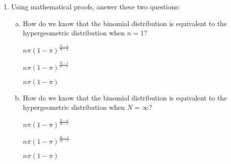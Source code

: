 \begin{enumerate}
  \item Using mathematical proofs, answer these two questions: 
  \begin{enumerate}[a) ]
   \item How do we know that the binomial distribution is equivalent to the hypergeometric distribution when $n=1$? 
\begin{solution}

$n \pi (1 - \pi)^{\frac{N-n}{N-1}}$

$n \pi (1 - \pi)^{\frac{N-1}{N-1}}$

$n \pi (1 - \pi)$
\end{solution}
   \item How do we know that the binomial distribution is equivalent to the hypergeometric distribution when $N=\infty$?
\begin{solution}

$n \pi (1 - \pi)^{\frac{N-n}{N-1}}$

$n \pi (1 - \pi)^{\frac{\infty-1}{\infty-1}}$

$n \pi (1 - \pi)$
\end{solution}
  \end{enumerate}
  

\end{enumerate}









